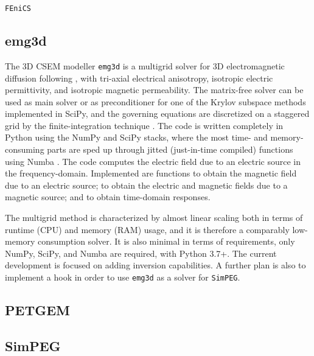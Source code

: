 \documentclass[
    paper,
  ]{geophysics}
\newcommand{\emg}[2]{\texttt{emg#1#2}\xspace}
\newcommand{\simpeg}{\texttt{SimPEG}\xspace}
\begin{document}
\texttt{FEniCS} \citep{CSE.15.Alnaes}

\subsection{emg3d}

The 3D CSEM modeller \emg3d is a multigrid \citep{CMMP.64.Fedorenko} solver for
3D electromagnetic diffusion following \cite{GP.06.Mulder}, with tri-axial
electrical anisotropy, isotropic electric permittivity, and isotropic magnetic
permeability. The matrix-free solver can be used as main solver or as
preconditioner for one of the Krylov subspace methods implemented in SciPy, and
the governing equations are discretized on a staggered grid by the
finite-integration technique \citep{AEU.77.Weiland}. The code is written
completely in Python using the NumPy and SciPy stacks, where the most time- and
memory-consuming parts are sped up through jitted (just-in-time compiled)
functions using Numba \citep{LLVM.15.Lam}. The code computes the electric field
due to an electric source in the frequency-domain. Implemented are functions to
obtain the magnetic field due to an electric source; to obtain the electric and
magnetic fields due to a magnetic source; and to obtain time-domain responses.

The multigrid method is characterized by almost linear scaling both in terms of
runtime (CPU) and memory (RAM) usage, and it is therefore a comparably
low-memory consumption solver. It is also minimal in terms of requirements,
only NumPy, SciPy, and Numba are required, with Python 3.7+. The current
development is focused on adding inversion capabilities. A further plan is also
to implement a hook in order to use \emg3d as a solver for \simpeg.

\subsection{PETGEM}


\subsection{SimPEG}
\end{document}

